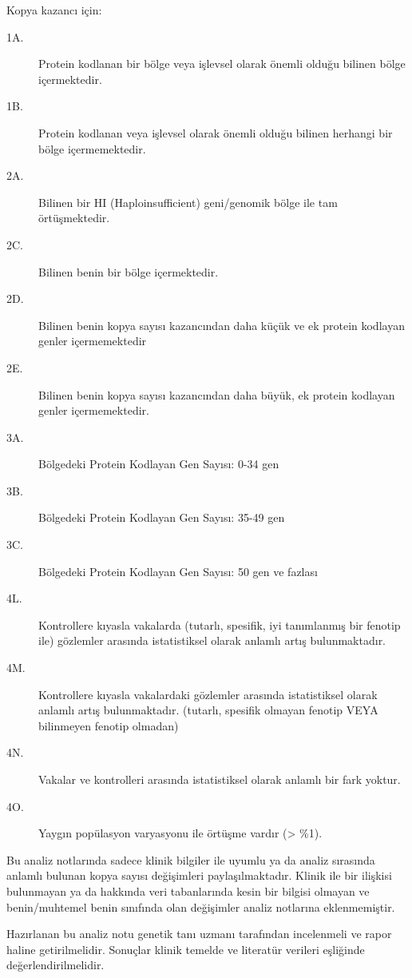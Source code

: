 \documentclass{article}
\begin{document}
Kopya kazancı için:
\begin{description}
\item[1A.] Protein kodlanan bir bölge veya işlevsel olarak önemli olduğu bilinen bölge içermektedir.
\item[1B.] Protein kodlanan veya işlevsel olarak önemli olduğu bilinen herhangi bir bölge içermemektedir.
\item[2A.] Bilinen bir HI (Haploinsufficient) geni/genomik bölge ile tam örtüşmektedir.
\item[2C.] Bilinen benin bir bölge içermektedir.
\item[2D.] Bilinen benin kopya sayısı kazancından daha küçük ve ek protein kodlayan genler içermemektedir
\item[2E.] Bilinen benin kopya sayısı kazancından daha büyük, ek protein kodlayan genler içermemektedir.
\item[3A.] Bölgedeki Protein Kodlayan Gen Sayısı: 0-34 gen
\item[3B.] Bölgedeki Protein Kodlayan Gen Sayısı: 35-49 gen
\item[3C.] Bölgedeki Protein Kodlayan Gen Sayısı: 50 gen ve fazlası
\item[4L.] Kontrollere kıyasla vakalarda (tutarlı, spesifik, iyi tanımlanmış bir fenotip ile) gözlemler arasında istatistiksel olarak anlamlı artış bulunmaktadır.
\item[4M.] Kontrollere kıyasla vakalardaki gözlemler arasında istatistiksel olarak anlamlı artış bulunmaktadır. (tutarlı, spesifik olmayan fenotip VEYA bilinmeyen fenotip olmadan)
\item[4N.] Vakalar ve kontrolleri arasında istatistiksel olarak anlamlı bir fark yoktur.
\item[4O.] Yaygın popülasyon varyasyonu ile örtüşme vardır (> \%1).
\end{description}

Bu analiz notlarında sadece klinik bilgiler ile uyumlu ya da analiz sırasında anlamlı bulunan kopya sayısı değişimleri paylaşılmaktadır. Klinik ile bir ilişkisi bulunmayan ya da hakkında veri tabanlarında kesin bir bilgisi olmayan ve benin/muhtemel benin sınıfında olan değişimler analiz notlarına eklenmemiştir.

Hazırlanan bu analiz notu genetik tanı uzmanı tarafından incelenmeli ve rapor haline getirilmelidir. Sonuçlar klinik temelde ve literatür verileri eşliğinde değerlendirilmelidir.
\end{document}
